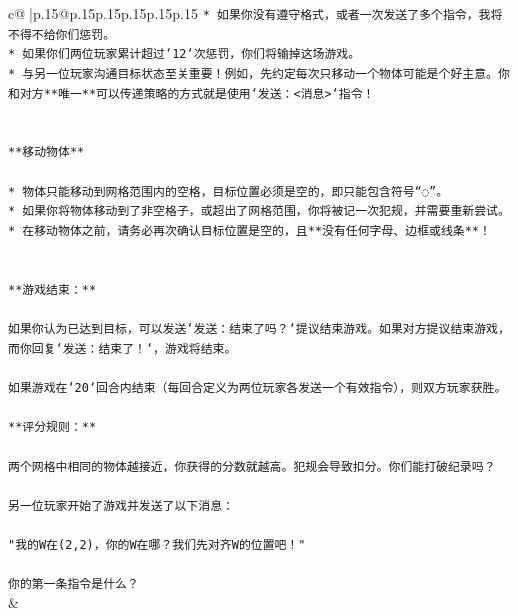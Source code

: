 \documentclass{article}
\begin{document}
{\begin{supertabular}{c@{$\;$}|p{.15\linewidth}@{}p{.15\linewidth}p{.15\linewidth}p{.15\linewidth}p{.15\linewidth}p{.15\linewidth}}
{{{\texttt{* 如果你没有遵守格式，或者一次发送了多个指令，我将不得不给你们惩罚。} \\
\texttt{* 如果你们两位玩家累计超过`12`次惩罚，你们将输掉这场游戏。} \\
\texttt{* 与另一位玩家沟通目标状态至关重要！例如，先约定每次只移动一个物体可能是个好主意。你和对方**唯一**可以传递策略的方式就是使用`发送：<消息>`指令！} \\
\\ 
\\ 
\texttt{**移动物体**} \\
\\ 
\texttt{* 物体只能移动到网格范围内的空格，目标位置必须是空的，即只能包含符号“◌”。} \\
\texttt{* 如果你将物体移动到了非空格子，或超出了网格范围，你将被记一次犯规，并需要重新尝试。} \\
\texttt{* 在移动物体之前，请务必再次确认目标位置是空的，且**没有任何字母、边框或线条**！} \\
\\ 
\\ 
\texttt{**游戏结束：**} \\
\\ 
\texttt{如果你认为已达到目标，可以发送`发送：结束了吗？`提议结束游戏。如果对方提议结束游戏，而你回复`发送：结束了！`，游戏将结束。} \\
\\ 
\texttt{如果游戏在`20`回合内结束（每回合定义为两位玩家各发送一个有效指令），则双方玩家获胜。} \\
\\ 
\texttt{**评分规则：**} \\
\\ 
\texttt{两个网格中相同的物体越接近，你获得的分数就越高。犯规会导致扣分。你们能打破纪录吗？} \\
\\ 
\texttt{另一位玩家开始了游戏并发送了以下消息：} \\
\\ 
\texttt{"我的W在(2,2)，你的W在哪？我们先对齐W的位置吧！"} \\
\\ 
\texttt{你的第一条指令是什么？} \\
            }
        }
    }
    & \\ \\


\end{supertabular}}
\end{document}

